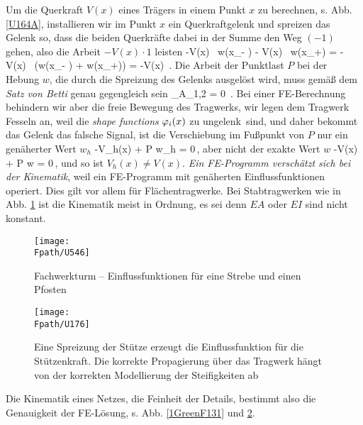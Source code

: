 Um die Querkraft $V(x)$ eines Tr\"{a}gers in einem Punkt $x$ zu berechnen, s. Abb.  \ref{U164A},  installieren wir im Punkt $x$ ein Querkraftgelenk und spreizen das Gelenk so, dass die beiden Querkr\"{a}fte dabei in der Summe den Weg $(-1)$ gehen, also die Arbeit $- V(x) \cdot 1$ leisten
\beq
-V(x) \, w(x_{-} ) - V(x) \, w(x_{+}) = -V(x) \, (w(x_{-} )
 + w(x_{+})) = -V(x) \,.
\eeq
Die Arbeit der Punktlast $P$ bei der Hebung $w$, die durch die Spreizung des Gelenks ausgel\"{o}st wird, muss gem\"{a}{\ss} dem {\em Satz von Betti\/} genau gegengleich sein
\beq
{}_{A_{1,2}} = 0 \,.
\eeq
Bei einer FE-Berechnung behindern wir aber die freie Bewegung des Tragwerks, wir legen dem Tragwerk Fesseln an, weil die {\em shape functions\/} $\varphi_i(x)$ zu \glq ungelenk\grq\ sind, und daher bekommt das Gelenk das falsche Signal, ist die Verschiebung im Fu{\ss}punkt von $P$ nur ein gen\"{a}herter Wert $w_h$
\beq
-V_h(x)  + P \cdot w_h = 0\,,
\eeq
aber nicht der exakte Wert $w$
\beq
-V(x)   + P \cdot w = 0\,,
\eeq
und so ist $V_h(x) \neq V(x)$. {\em Ein FE-Programm versch\"{a}tzt sich bei der Kinematik\/}, weil ein FE-Programm  mit gen\"{a}herten Einflussfunktionen operiert. Dies gilt vor allem f\"{u}r Fl\"{a}chentragwerke. Bei Stabtragwerken wie in Abb. \ref{U546} ist die Kinematik meist in Ordnung, es sei denn $EA$ oder $EI$ sind nicht konstant.

\begin{figure}[tbp]
\centering
\if {} \sidecaption \fi
\texttt{[image: \\Fpath/U546]}
\caption{Fachwerkturm -- Einflussfunktionen f\"{u}r eine Strebe und einen Pfosten} \label{U546}
\end{figure}%
\begin{figure}
\centering
\if {} \sidecaption \fi
\texttt{[image: \\Fpath/U176]}
\caption{Eine Spreizung der St\"{u}tze erzeugt die Einflussfunktion f\"{u}r die St\"{u}tzenkraft. Die korrekte Propagierung \"{u}ber das Tragwerk h\"{a}ngt von der korrekten Modellierung der Steifigkeiten ab}
\label{U176}%
\end{figure}%

Die Kinematik eines Netzes, die Feinheit der Details, bestimmt also die Genauigkeit der FE-L\"{o}sung, s. Abb. \ref{1GreenF131} und \ref{U176}.\\

